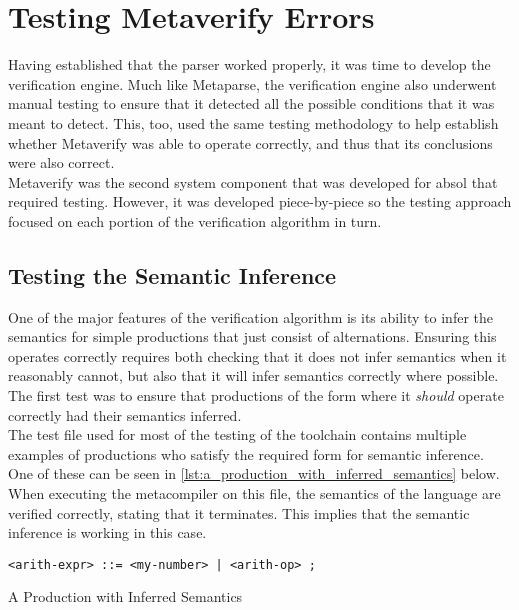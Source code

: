 


\section{Testing Metaverify Errors} %
\label{sec:testing_metaverify_errors}
Having established that the parser worked properly, it was time to develop the verification engine. 
Much like Metaparse, the verification engine also underwent manual testing to ensure that it detected all the possible conditions that it was meant to detect. 
This, too, used the same testing methodology to help establish whether Metaverify was able to operate correctly, and thus that its conclusions were also correct.\\

Metaverify was the second system component that was developed for \gls{absol} that required testing.
However, it was developed piece-by-piece so the testing approach focused on each portion of the verification algorithm in turn. 

\subsection{Testing the Semantic Inference} %
\label{sub:testing_the_semantic_inference}
One of the major features of the verification algorithm is its ability to infer the semantics for simple productions that just consist of alternations. 
Ensuring this operates correctly requires both checking that it does not infer semantics when it reasonably cannot, but also that it will infer semantics correctly where possible.
The first test was to ensure that productions of the form where it \textit{should} operate correctly had their semantics inferred. \\

The test file used for most of the testing of the toolchain contains multiple examples of productions who satisfy the required form for semantic inference. 
One of these can be seen in \autoref{lst:a_production_with_inferred_semantics} below. 
When executing the metacompiler on this file, the semantics of the language are verified correctly, stating that it terminates.
This implies that the semantic inference is working in this case. 

\begin{listing}[!htb]
\begin{verbatim}
<arith-expr> ::= <my-number> | <arith-op> ;
\end{verbatim}
\caption{A Production with Inferred Semantics}
\label{lst:a_production_with_inferred_semantics}
\end{listing}

